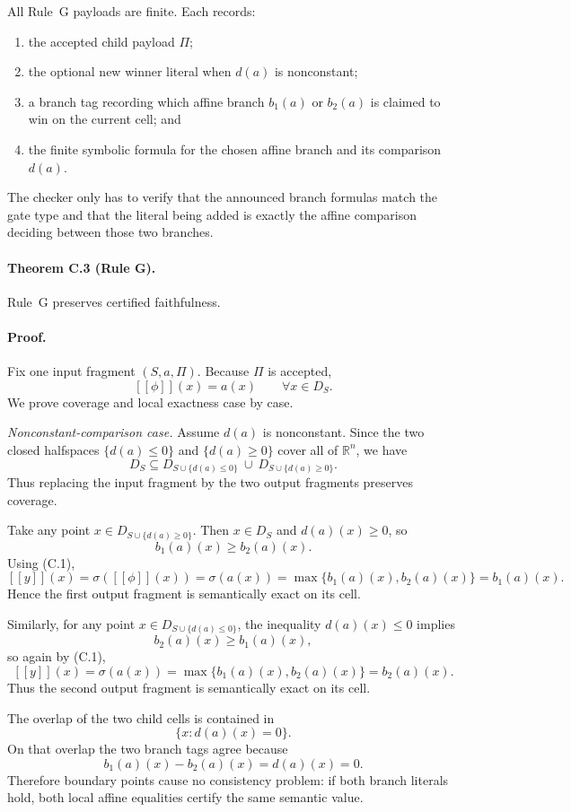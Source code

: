 All Rule~G payloads are finite. Each records:
\begin{enumerate}
    \item the accepted child payload $\Pi$;
    \item the optional new winner literal when $d(a)$ is nonconstant;
    \item a branch tag recording which affine branch $b_1(a)$ or $b_2(a)$ is claimed to win on the current cell; and
    \item the finite symbolic formula for the chosen affine branch and its comparison $d(a)$.
\end{enumerate}
The checker only has to verify that the announced branch formulas match the gate type and that the literal being added is exactly the affine comparison deciding between those two branches.

\paragraph{Theorem C.3 (Rule G).}
Rule~G preserves certified faithfulness.

\paragraph{Proof.}
Fix one input fragment $(S,a,\Pi)$. Because $\Pi$ is accepted,
\[
 [[\phi]](x)=a(x)
 \qquad \forall x\in D_S.
\tag{C.1}
\]
We prove coverage and local exactness case by case.

\emph{Nonconstant-comparison case.}
Assume $d(a)$ is nonconstant. Since the two closed halfspaces $\{d(a)\le 0\}$ and $\{d(a)\ge 0\}$ cover all of $\mathbb R^n$, we have
\[
 D_S\subseteq D_{S\cup\{d(a)\le 0\}}\ \cup\ D_{S\cup\{d(a)\ge 0\}}.
\]
Thus replacing the input fragment by the two output fragments preserves coverage.

Take any point $x\in D_{S\cup\{d(a)\ge 0\}}$. Then $x\in D_S$ and $d(a)(x)\ge 0$, so
\[
 b_1(a)(x)\ge b_2(a)(x).
\]
Using (C.1),
\[
 [[y]](x)=\sigma([[\phi]](x))=\sigma(a(x))=\max\{b_1(a)(x),b_2(a)(x)\}=b_1(a)(x).
\]
Hence the first output fragment is semantically exact on its cell.

Similarly, for any point $x\in D_{S\cup\{d(a)\le 0\}}$, the inequality $d(a)(x)\le 0$ implies
\[
 b_2(a)(x)\ge b_1(a)(x),
\]
so again by (C.1),
\[
 [[y]](x)=\sigma(a(x))=\max\{b_1(a)(x),b_2(a)(x)\}=b_2(a)(x).
\]
Thus the second output fragment is semantically exact on its cell.

The overlap of the two child cells is contained in
\[
 \{x:d(a)(x)=0\}.
\]
On that overlap the two branch tags agree because
\[
 b_1(a)(x)-b_2(a)(x)=d(a)(x)=0.
\]
Therefore boundary points cause no consistency problem: if both branch literals hold, both local affine equalities certify the same semantic value.

